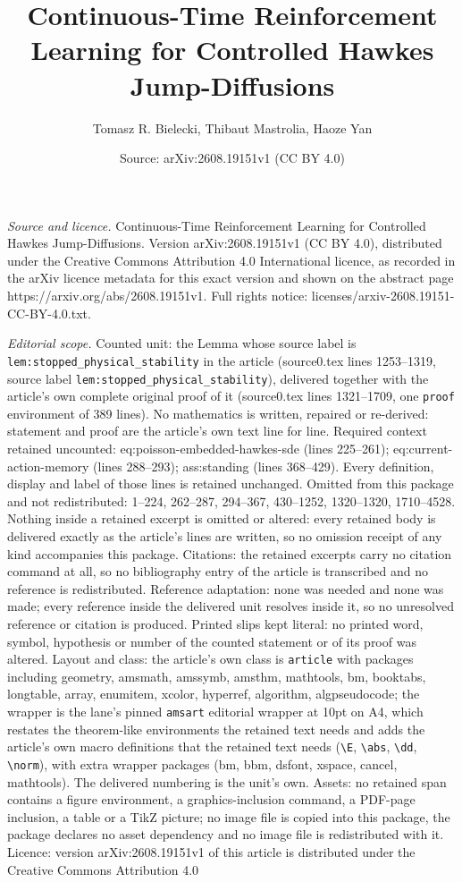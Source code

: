 \documentclass[10pt,a4paper]{amsart}
\title[Continuous-Time Reinforcement Learning for Controlled Hawkes]{Continuous-Time Reinforcement Learning for Controlled Hawkes Jump-Diffusions}
\author{Tomasz R. Bielecki, Thibaut Mastrolia, Haoze Yan}
\date{Source: arXiv:2608.19151v1 (CC BY 4.0)}
\begin{document}
\maketitle

\noindent\emph{Source and licence.} Continuous-Time Reinforcement Learning for Controlled Hawkes Jump-Diffusions. Version arXiv:2608.19151v1 (CC BY 4.0), distributed under the Creative Commons Attribution 4.0 International licence, as recorded in the arXiv licence metadata for this exact version and shown on the abstract page https://arxiv.org/abs/2608.19151v1. Full rights notice: licenses/arxiv-2608.19151-CC-BY-4.0.txt.\par\smallskip

\noindent\textit{Editorial scope.} Counted unit: the Lemma whose source label is \texttt{lem:stopped\_physical\_stability} in the article (source0.tex lines 1253--1319, source label \texttt{lem:stopped\_physical\_stability}), delivered together with the article's own complete original proof of it (source0.tex lines 1321--1709, one \texttt{proof} environment of 389 lines). No mathematics is written, repaired or re-derived: statement and proof are the article's own text line for line. Required context retained uncounted: eq:poisson-embedded-hawkes-sde (lines 225--261); eq:current-action-memory (lines 288--293); ass:standing (lines 368--429). Every definition, display and label of those lines is retained unchanged. Omitted from this package and not redistributed: 1--224, 262--287, 294--367, 430--1252, 1320--1320, 1710--4528. Nothing inside a retained excerpt is omitted or altered: every retained body is delivered exactly as the article's lines are written, so no omission receipt of any kind accompanies this package. Citations: the retained excerpts carry no citation command at all, so no bibliography entry of the article is transcribed and no reference is redistributed. Reference adaptation: none was needed and none was made; every reference inside the delivered unit resolves inside it, so no unresolved reference or citation is produced. Printed slips kept literal: no printed word, symbol, hypothesis or number of the counted statement or of its proof was altered. Layout and class: the article's own class is \texttt{article} with packages including geometry, amsmath, amssymb, amsthm, mathtools, bm, booktabs, longtable, array, enumitem, xcolor, hyperref, algorithm, algpseudocode; the wrapper is the lane's pinned \texttt{amsart} editorial wrapper at 10pt on A4, which restates the theorem-like environments the retained text needs and adds the article's own macro definitions that the retained text needs (\texttt{\textbackslash E}, \texttt{\textbackslash abs}, \texttt{\textbackslash dd}, \texttt{\textbackslash norm}), with extra wrapper packages (bm, bbm, dsfont, xspace, cancel, mathtools). The delivered numbering is the unit's own. Assets: no retained span contains a figure environment, a graphics-inclusion command, a PDF-page inclusion, a table or a TikZ picture; no image file is copied into this package, the package declares no asset dependency and no image file is redistributed with it. Licence: version arXiv:2608.19151v1 of this article is distributed under the Creative Commons Attribution 4.0 
\end{document}
